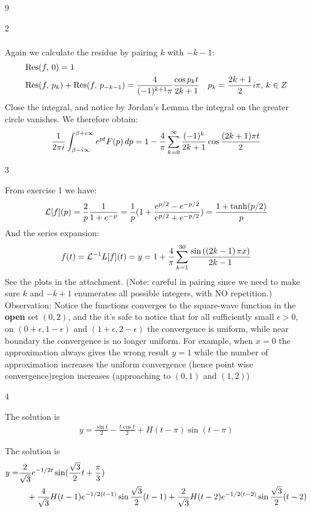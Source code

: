 \begin{vv286}{9}
\begin{vv286_mp}{2}
\begin{align*}
   \end{align*}
 \item[(ii)]
   Again we calculate the residue by pairing $k$ with $-k-1$:
   \begin{align*}
     &\hbox{$\mathop{\rm Res}(f,\,0)$}=1\\
     &\hbox{$\mathop{\rm Res}(f,\,p_k)$}+\hbox{$\mathop{\rm Res}(f,\,p_{-k-1})$}=\frac{4}{(-1)^{k+1}\pi}\frac{\cos p_kt}{2k+1}\quad
     p_k=\frac{2k+1}{2}i\pi, \, k\in Z
   \end{align*}
    Close the integral, and notice by Jordan's Lemma the integral on the
   greater circle vanishes. We therefore obtain:
 \begin{align*}
     \frac{1}{2\pi i}\int_{\beta-i\infty}^{\beta+i\infty}e^{pt}F(p)\, dp=
     1-\frac{4}{\pi}\sum_{k=0}^{\infty}\frac{(-1)^k}{2k+1}\cos \frac{(2k+1)\pi t}{2}
   \end{align*}
  \end{vv286_mp}
  \begin{vv286_ms}{3}
  \item[]
    From exercise 1 we have:
    \begin{align*}
      \mathcal{L}[f](p)=\frac{2}{p}\frac{1}{1+e^{-p}}=\frac{1}{p}(1+\frac{e^{p/2}-e^{-p/2}}{e^{p/2}+e^{-p/2}})=\frac{1+\tanh(p/2)}{p}
    \end{align*}
    And the series expansion:
   \begin{align*}
     f(t)=\mathcal{L}^{-1}L[f](t)=y=1+\frac{4}{\pi }\sum_{k=1}^{30}{\frac{\sin \left( \left( 2k-1 \right)\pi x \right)}{2k-1}}
   \end{align*}
   See the plots in the attachment.
   (Note: careful in pairing since we need to make sure $k$ and
   $-k+1$ enumerates all possible integers, with NO repetition.)\\
   Observation:
Notice the functions converges to the square-wave function in the {\bf open} set $(0,2)$, and the it's safe to notice that for all sufficiently small $\epsilon>0$, on $(0+\epsilon,  1-\epsilon)$ and $(1+\epsilon,  2-\epsilon)$ the convergence is uniform, while near boundary the convergence is no longer uniform. For example, when $x=0$ the approximation always gives the wrong result $y=1$ while the number of approximation increases the uniform convergence (hence point wise convergence)region increases (approaching to $(0,1)$ and $(1,2)$)

  \end{vv286_ms}
  \begin{vv286_ms}{4}
  \item[(i)]
    The solution is
    \begin{align*}
      y=\frac{\sin t}{2}-\frac{t\cos t}{2}+H(t-\pi)\sin (t-\pi)
    \end{align*}
   \item[(ii)]
     The solution is
     \begin{align*}
       y=&\frac{2}{\sqrt{3}}e^{-1/2t}\sin (\frac{\sqrt{3}}{2}t+\frac{\pi}{3})\\
       &\quad+\frac{4}{\sqrt{3}}H(t-1)e^{-1/2(t-1)}\sin \frac{\sqrt{3}}{2}(t-1)+
       \frac{2}{\sqrt{3}}H(t-2)e^{-1/2(t-2)}\sin \frac{\sqrt{3}}{2}(t-2)
     \end{align*}
  \end{vv286_ms}


\end{vv286}
